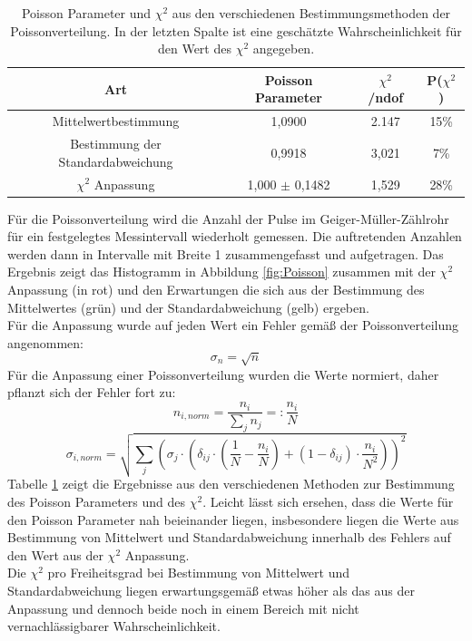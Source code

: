 \documentclass[12pt,a4paper]{article}
\begin{document}
\begin{table}
\centering
\begin{tabular}{|c|c|c|c|}
\hline 
Art & Poisson Parameter & $\chi ^2$ /ndof & P($\chi ^2$) \\ 
\hline 
Mittelwertbestimmung & 1,0900 & 2.147 & 15\% \\ 
\hline 
Bestimmung der Standardabweichung & 0,9918 & 3,021 & 7\% \\ 
\hline 
$\chi ^2$ Anpassung & 1,000 $\pm$ 0,1482 & 1,529 & 28\% \\ 
\hline 
\end{tabular} 
\caption{Poisson Parameter und $\chi ^2$ aus den verschiedenen Bestimmungsmethoden der Poissonverteilung. In der letzten Spalte ist eine geschätzte Wahrscheinlichkeit für den Wert des $\chi ^2$ angegeben.}
\label{tab:Poisson}
\end{table}

Für die Poissonverteilung wird die Anzahl der Pulse im Geiger-Müller-Zählrohr für ein festgelegtes Messintervall wiederholt gemessen. Die auftretenden Anzahlen werden dann in Intervalle mit Breite 1 zusammengefasst und aufgetragen. Das Ergebnis zeigt das Histogramm in Abbildung \ref{fig:Poisson} zusammen mit der $\chi ^2$ Anpassung (in rot) und den Erwartungen die sich aus der Bestimmung des Mittelwertes (grün) und der Standardabweichung (gelb) ergeben.\\
Für die Anpassung wurde auf jeden Wert ein Fehler gemäß der Poissonverteilung angenommen:
\begin{equation*}
\sigma _{n} = \sqrt{n}
\end{equation*}
Für die Anpassung einer Poissonverteilung wurden die Werte normiert, daher pflanzt sich der Fehler fort zu:
\begin{equation*}
n_{i, norm} = \dfrac{n_i}{\sum _j n_j} =: \dfrac{n_i}{N}
\end{equation*}
\begin{equation*}
\sigma _{i, norm} = \sqrt{ \sum _j \left( \sigma_j \cdot \left( \delta_{ij} \cdot \left( \frac{1}{N} - \frac{n_i}{N} \right) + (1 - \delta_{ij}) \cdot \frac{n_i}{N^2} \right) \right)^2 }
\end{equation*}
Tabelle \ref{tab:Poisson} zeigt die Ergebnisse aus den verschiedenen Methoden zur Bestimmung des Poisson Parameters und des $\chi ^2$. Leicht lässt sich ersehen, dass die Werte für den Poisson Parameter nah beieinander liegen, insbesondere liegen die Werte aus Bestimmung von Mittelwert und Standardabweichung innerhalb des Fehlers auf den Wert aus der $\chi ^2$ Anpassung.\\
Die $\chi ^2$ pro Freiheitsgrad bei Bestimmung von Mittelwert und Standardabweichung liegen erwartungsgemäß etwas höher als das aus der Anpassung und dennoch beide noch in einem Bereich mit nicht vernachlässigbarer Wahrscheinlichkeit.
\end{document}
